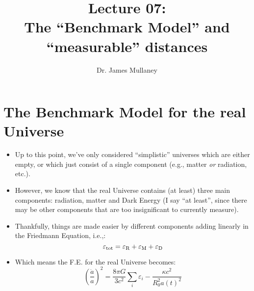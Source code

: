 \documentclass[11pt]{article}
\begin{document}
 
\title{Lecture 07:\\The ``Benchmark Model'' and \\``measurable'' distances}
\author{Dr. James Mullaney}
\maketitle
\section{The Benchmark Model for the real Universe}
\begin{itemize}
\item Up to this point, we've only considered ``simplistic'' universes which are either empty, or which just consist of a single component (e.g., matter {\it or} radiation, etc.).
\item However, we know that the real Universe contains (at least) three main components: radiation, matter and Dark Energy (I say ``at least'', since there may be other components that are too insignificant to currently measure).
\item Thankfully, things are made easier by different components adding linearly in the Friedmann Equation, i.e.,:
\begin{equation}
    \varepsilon{_{\rm tot}} = \varepsilon{_{\rm R}}+\varepsilon{_{\rm M}}+\varepsilon{_{\rm D}}
\end{equation}

\item Which means the F.E. for the real Universe becomes:
\begin{equation}
    \left(\frac{\dot{a}}{a}\right)^2 = \frac{8\pi G}{3c^2}\sum_i\varepsilon{_i}-\frac{\kappa c^2}{R_0^2a(t)^2}
\end{equation}
    


\end{itemize}
\end{document}
